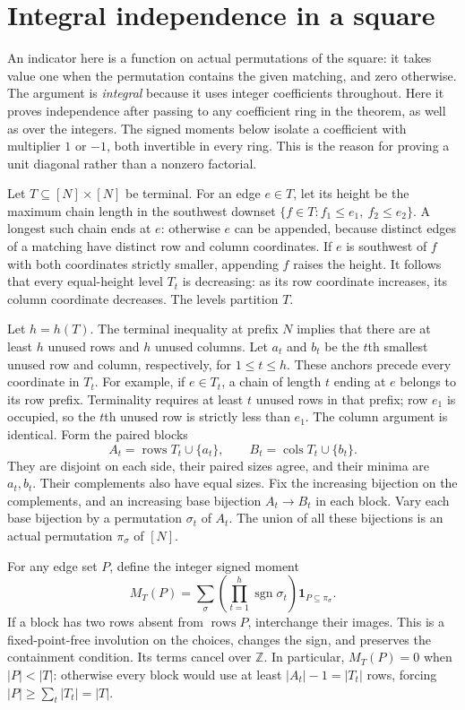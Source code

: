 \section{Integral independence in a square}
An indicator here is a function on actual permutations of the square:
it takes value one when the permutation contains the given matching,
and zero otherwise. The argument is \emph{integral} because it uses
integer coefficients throughout. Here it proves independence after
passing to any coefficient ring in the theorem, as well as over
the integers. The signed moments below isolate a coefficient
with multiplier $1$ or $-1$, both invertible in every ring. This is the
reason for proving a unit diagonal rather than a nonzero factorial.


Let $T\subseteq[N]\times[N]$ be terminal.  For an edge $e\in T$, let
its height be the maximum chain length in the southwest downset
$\{f\in T:f_1\leq e_1,\ f_2\leq e_2\}$.  A longest such chain ends
at $e$: otherwise $e$ can be appended, because distinct edges of a
matching have distinct row and column coordinates.  If $e$ is southwest
of $f$ with both coordinates strictly smaller, appending $f$ raises the
height.  It follows that every equal-height level $T_t$ is decreasing:
as its row coordinate increases, its column coordinate decreases.
The levels partition $T$.

Let $h=h(T)$.  The terminal inequality at prefix $N$ implies that there
are at least $h$ unused rows and $h$ unused columns.  Let $a_t$ and $b_t$
be the $t$th smallest unused row and column, respectively, for
$1\leq t\leq h$.  These anchors precede every coordinate in $T_t$.
For example, if $e\in T_t$, a chain of length $t$ ending at $e$ belongs
to its row prefix.  Terminality requires at least $t$ unused rows in
that prefix; row $e_1$ is occupied, so the $t$th unused row is strictly
less than $e_1$.  The column argument is identical.  Form the paired blocks
\[
 A_t=\operatorname{rows}T_t\cup\{a_t\},\qquad
 B_t=\operatorname{cols}T_t\cup\{b_t\}.
\]
They are disjoint on each side, their paired sizes agree, and their
minima are $a_t,b_t$.  Their complements also have equal sizes.  Fix the
increasing bijection on the complements, and an increasing base bijection
$A_t\to B_t$ in each block.  Vary each base bijection by a permutation
$\sigma_t$ of $A_t$.  The union of all these bijections is an actual
permutation $\pi_\sigma$ of $[N]$.

For any edge set $P$, define the integer signed moment
\[
 M_T(P)=\sum_{\sigma}
     \left(\prod_{t=1}^{h}\operatorname{sgn}\sigma_t\right)
     \boldsymbol{1}_{P\subseteq\pi_\sigma}.
\]
If a block has two rows absent from $\operatorname{rows}P$, interchange
their images.  This is a fixed-point-free involution on the choices,
changes the sign, and preserves the containment condition.  Its terms
cancel over $\mathbb Z$.  In particular, $M_T(P)=0$ when $|P|<|T|$:
otherwise every block would use at least $|A_t|-1=|T_t|$ rows, forcing
$|P|\geq\sum_t|T_t|=|T|$.

